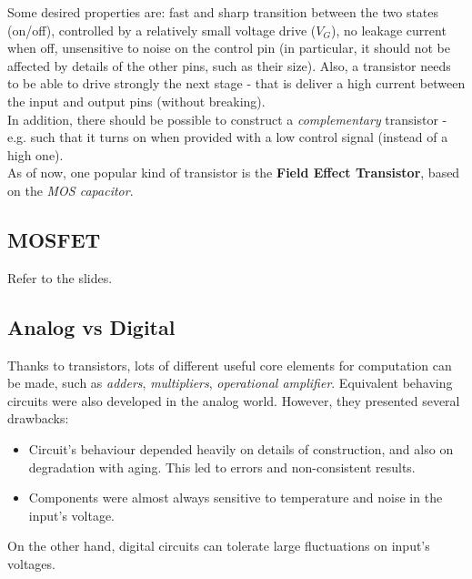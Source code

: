 \documentclass[../template.tex]{subfiles}
\begin{document}
Some desired properties are: fast and sharp transition between the two states (on/off), controlled by a relatively small voltage drive ($V_G$), no leakage current when off, unsensitive to noise on the control pin (in particular, it should not be affected by details of the other pins, such as their size). Also, a transistor needs to be able to drive strongly the next stage - that is deliver a high current between the input and output pins (without breaking).\\
In addition, there should be possible to construct a \textit{complementary} transistor - e.g. such that it turns on when provided with a low control signal (instead of a high one).\\

As of now, one popular kind of transistor is the \textbf{Field Effect Transistor}, based on the \textit{MOS capacitor}.  

\subsection{MOSFET}
Refer to the slides.

\subsection{Analog vs Digital}
Thanks to transistors, lots of different useful core elements for computation can be made, such as \textit{adders}, \textit{multipliers}, \textit{operational amplifier}. Equivalent behaving circuits were also developed in the analog world. However, they presented several drawbacks:
\begin{itemize}
    \item Circuit's behaviour depended heavily on details of construction, and also on degradation with aging. This led to errors and non-consistent results.
    \item Components were almost always sensitive to temperature and noise in the input's voltage.
\end{itemize}
On the other hand, digital circuits can tolerate large fluctuations on input's voltages. 
\end{document}
